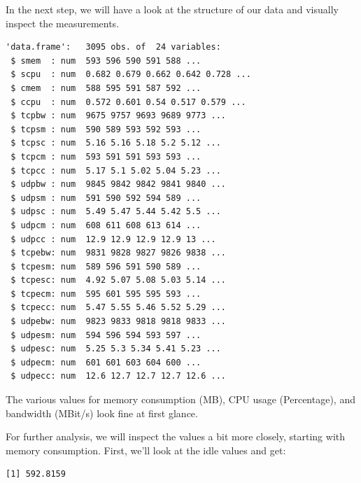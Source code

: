 In the next step, we will have a look at the structure of our data and
visually inspect the measurements.

\begin{Shaded}
\begin{Highlighting}[]
\end{Highlighting}
\end{Shaded}

\begin{verbatim}
'data.frame':   3095 obs. of  24 variables:
 $ smem  : num  593 596 590 591 588 ...
 $ scpu  : num  0.682 0.679 0.662 0.642 0.728 ...
 $ cmem  : num  588 595 591 587 592 ...
 $ ccpu  : num  0.572 0.601 0.54 0.517 0.579 ...
 $ tcpbw : num  9675 9757 9693 9689 9773 ...
 $ tcpsm : num  590 589 593 592 593 ...
 $ tcpsc : num  5.16 5.16 5.18 5.2 5.12 ...
 $ tcpcm : num  593 591 591 593 593 ...
 $ tcpcc : num  5.17 5.1 5.02 5.04 5.23 ...
 $ udpbw : num  9845 9842 9842 9841 9840 ...
 $ udpsm : num  591 590 592 594 589 ...
 $ udpsc : num  5.49 5.47 5.44 5.42 5.5 ...
 $ udpcm : num  608 611 608 613 614 ...
 $ udpcc : num  12.9 12.9 12.9 12.9 13 ...
 $ tcpebw: num  9831 9828 9827 9826 9838 ...
 $ tcpesm: num  589 596 591 590 589 ...
 $ tcpesc: num  4.92 5.07 5.08 5.03 5.14 ...
 $ tcpecm: num  595 601 595 595 593 ...
 $ tcpecc: num  5.47 5.55 5.46 5.52 5.29 ...
 $ udpebw: num  9823 9833 9818 9818 9833 ...
 $ udpesm: num  594 596 594 593 597 ...
 $ udpesc: num  5.25 5.3 5.34 5.41 5.23 ...
 $ udpecm: num  601 601 603 604 600 ...
 $ udpecc: num  12.6 12.7 12.7 12.7 12.6 ...
\end{verbatim}

The various values for memory consumption (MB), CPU usage (Percentage), and
bandwidth (MBit/s) look fine at first glance.

For further analysis, we will inspect the values a bit more
closely, starting with memory consumption. First, we'll look at the idle values and get:

\begin{Shaded}
\begin{Highlighting}[]
\SpecialCharTok{\$}
\end{Highlighting}
\end{Shaded}

\begin{verbatim}
[1] 592.8159
\end{verbatim}

\begin{Shaded}
\begin{Highlighting}[]
\SpecialCharTok{\$}
\end{Highlighting}
\end{Shaded}

